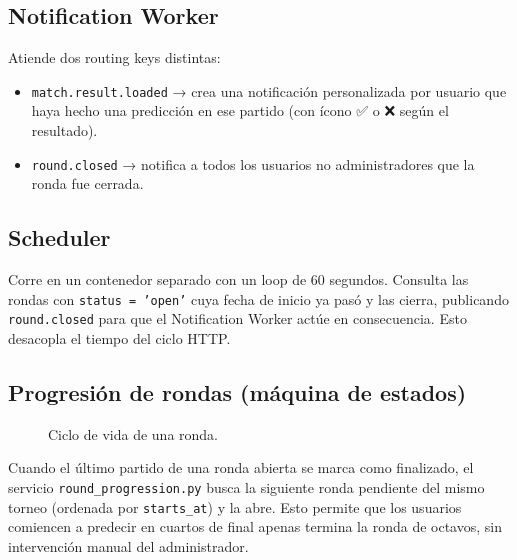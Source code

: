 \documentclass[12pt, a4paper]{article}
\begin{document}
\subsection{Notification Worker}

Atiende dos routing keys distintas:
\begin{itemize}[noitemsep]
  \item \texttt{match.result.loaded} → crea una notificación personalizada por usuario que haya hecho una predicción en ese partido (con ícono ✅ o ❌ según el resultado).
  \item \texttt{round.closed} → notifica a todos los usuarios no administradores que la ronda fue cerrada.
\end{itemize}

\subsection{Scheduler}

Corre en un contenedor separado con un loop de 60 segundos. Consulta las rondas con \texttt{status = 'open'} cuya fecha de inicio ya pasó y las cierra, publicando \texttt{round.closed} para que el Notification Worker actúe en consecuencia. Esto desacopla el tiempo del ciclo HTTP.

\subsection{Progresión de rondas (máquina de estados)}

\begin{figure}[H]
\centering
{}
\caption{Ciclo de vida de una ronda.}
\end{figure}

Cuando el último partido de una ronda abierta se marca como finalizado, el servicio \texttt{round\_progression.py} busca la siguiente ronda pendiente del mismo torneo (ordenada por \texttt{starts\_at}) y la abre. Esto permite que los usuarios comiencen a predecir en cuartos de final apenas termina la ronda de octavos, sin intervención manual del administrador.
\end{document}
